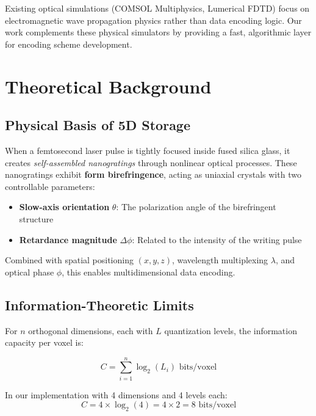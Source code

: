 \documentclass[11pt,a4paper]{article}
\begin{document}
Existing optical simulations (COMSOL Multiphysics, Lumerical FDTD) focus on electromagnetic wave propagation physics rather than data encoding logic. Our work complements these physical simulators by providing a fast, algorithmic layer for encoding scheme development.

\section{Theoretical Background}

\subsection{Physical Basis of 5D Storage}

When a femtosecond laser pulse is tightly focused inside fused silica glass, it creates \textit{self-assembled nanogratings} through nonlinear optical processes. These nanogratings exhibit \textbf{form birefringence}, acting as uniaxial crystals with two controllable parameters:

\begin{itemize}
    \item \textbf{Slow-axis orientation} $\theta$: The polarization angle of the birefringent structure
    \item \textbf{Retardance magnitude} $\Delta\phi$: Related to the intensity of the writing pulse
\end{itemize}

Combined with spatial positioning $(x, y, z)$, wavelength multiplexing $\lambda$, and optical phase $\phi$, this enables multidimensional data encoding.

\subsection{Information-Theoretic Limits}

For $n$ orthogonal dimensions, each with $L$ quantization levels, the information capacity per voxel is:

\begin{equation}
    C = \sum_{i=1}^{n} \log_2(L_i) \text{ bits/voxel}
\end{equation}

In our implementation with 4 dimensions and 4 levels each:
\begin{equation}
    C = 4 \times \log_2(4) = 4 \times 2 = 8 \text{ bits/voxel}
\end{equation}
\end{document}
